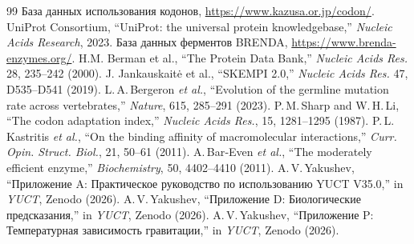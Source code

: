 \documentclass[12pt,a4paper]{article}
\begin{document}
	\begin{thebibliography}{99}
		 База данных использования кодонов, \url{https://www.kazusa.or.jp/codon/}.
		 UniProt Consortium, ``UniProt: the universal protein knowledgebase,'' \emph{Nucleic Acids Research}, 2023.
		 База данных ферментов BRENDA, \url{https://www.brenda-enzymes.org/}.
		 H.M. Berman et al., ``The Protein Data Bank,'' \emph{Nucleic Acids Res.} 28, 235–242 (2000).
		 J. Jankauskaitė et al., ``SKEMPI 2.0,'' \emph{Nucleic Acids Res.} 47, D535–D541 (2019).
		 L.\,A.\,Bergeron \emph{et al.}, ``Evolution of the germline mutation rate across vertebrates,'' \emph{Nature}, 615, 285–291 (2023).
		 P.\,M.\,Sharp and W.\,H.\,Li, ``The codon adaptation index,'' \emph{Nucleic Acids Res.}, 15, 1281–1295 (1987).
		 P.\,L.\,Kastritis \emph{et al.}, ``On the binding affinity of macromolecular interactions,'' \emph{Curr. Opin. Struct. Biol.}, 21, 50–61 (2011).
		 A.\,Bar‑Even \emph{et al.}, ``The moderately efficient enzyme,'' \emph{Biochemistry}, 50, 4402–4410 (2011).
		 A.\,V.\,Yakushev, ``Приложение A: Практическое руководство по использованию YUCT V35.0,'' in \emph{YUCT}, Zenodo (2026).
		 A.\,V.\,Yakushev, ``Приложение D: Биологические предсказания,'' in \emph{YUCT}, Zenodo (2026).
		 A.\,V.\,Yakushev, ``Приложение P: Температурная зависимость гравитации,'' in \emph{YUCT}, Zenodo (2026).
	\end{thebibliography}
	
\end{document}
